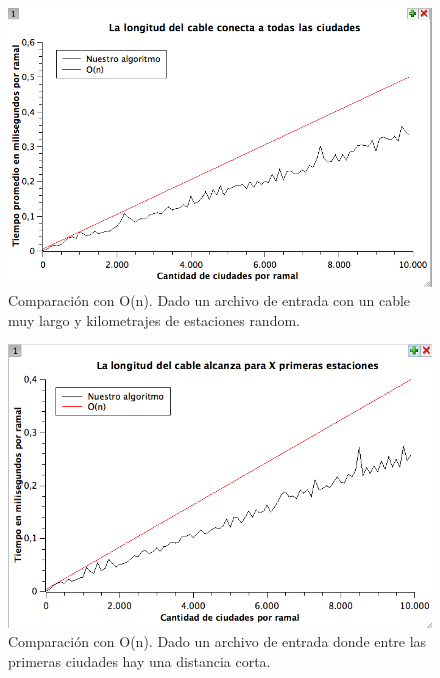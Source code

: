 \begin{figure}[H]
\begin{center}

  \includegraphics[width=\linewidth]{../graficos/ej1/CableLargo.png}
  \caption{{\small Comparación con O(n). Dado un archivo de entrada con un cable muy largo y kilometrajes de estaciones random.}} \label{ej1-tiempo-vs-cant-ciudades-random-long-cable-largo}
\endminipage

\end{center}
\end{figure}


\begin{figure}[H]
\begin{center}

  \includegraphics[width=\linewidth]{../graficos/ej1/PrimerasCiudades.png}
  \caption{{\small Comparación con O(n). Dado un archivo de entrada donde entre las primeras ciudades hay una distancia corta.}} \label{ej1-tiempo-vs-cant-ciudadades-primeras-ciudades}
\endminipage

\end{center}
\end{figure}

